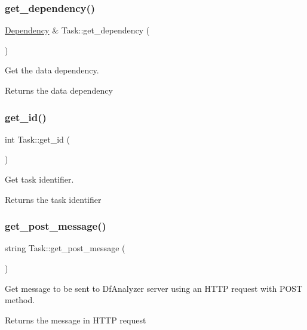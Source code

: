 \subsubsection{\texorpdfstring{get\+\_\+dependency()}{get\_dependency()}}
{\footnotesize\ttfamily \hyperlink{classDependency}{Dependency} \& Task\+::get\+\_\+dependency (\begin{DoxyParamCaption}{ }\end{DoxyParamCaption})}

Get the data dependency. \begin{DoxyReturn}{Returns}
the data dependency 
\end{DoxyReturn}
\mbox{\label{classTask_a40694bba7094fa408d1bd2f6ffb1c2ae}} 
\subsubsection{\texorpdfstring{get\+\_\+id()}{get\_id()}}
{\footnotesize\ttfamily int Task\+::get\+\_\+id (\begin{DoxyParamCaption}{ }\end{DoxyParamCaption})}

Get task identifier. \begin{DoxyReturn}{Returns}
the task identifier 
\end{DoxyReturn}
\mbox{\label{classTask_ae9ca005a8b6d0d3d794a7037f517ea20}} 
\subsubsection{\texorpdfstring{get\+\_\+post\+\_\+message()}{get\_post\_message()}}
{\footnotesize\ttfamily string Task\+::get\+\_\+post\+\_\+message (\begin{DoxyParamCaption}{ }\end{DoxyParamCaption})\hspace{0.3cm}{\ttfamily [protected]}}

Get message to be sent to Df\+Analyzer server using an H\+T\+TP request with P\+O\+ST method. \begin{DoxyReturn}{Returns}
the message in H\+T\+TP request 
\end{DoxyReturn}
\mbox{\label{classTask_a1275490d93daa52ade635a9121e0a5dd}} 
